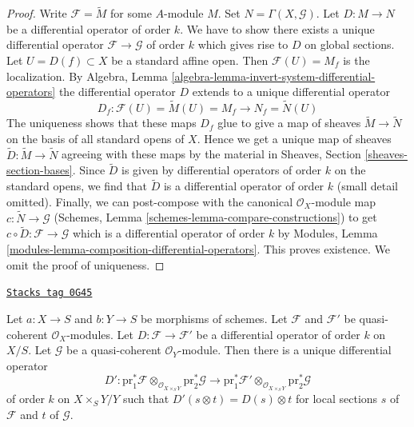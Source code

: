 \begin{proof}
Write $\mathcal{F} = \widetilde{M}$ for some $A$-module $M$. Set
$N = \Gamma(X, \mathcal{G})$. Let $D : M \to N$ be a differential
operator of order $k$. We have to show there exists
a unique differential operator $\mathcal{F} \to \mathcal{G}$ of order $k$
which gives rise to $D$ on global sections. Let $U = D(f) \subset X$
be a standard affine open. Then $\mathcal{F}(U) = M_f$ is the localization.
By Algebra, Lemma \ref{algebra-lemma-invert-system-differential-operators}
the differential operator $D$ extends to a unique differential operator
$$
D_f : \mathcal{F}(U) = \widetilde{M}(U) = M_f \to N_f = \widetilde{N}(U)
$$
The uniqueness shows that these maps $D_f$ glue to give a map of sheaves
$\widetilde{M} \to \widetilde{N}$ on the basis of all standard opens
of $X$. Hence we get a unique map of sheaves
$\widetilde{D} : \widetilde{M} \to \widetilde{N}$ agreeing with these maps
by the material in Sheaves, Section \ref{sheaves-section-bases}.
Since $\widetilde{D}$ is given by differential operators of order $k$ on
the standard opens, we find that $\widetilde{D}$ is a differential operator
of order $k$ (small detail omitted).
Finally, we can post-compose with the canonical $\mathcal{O}_X$-module map
$c : \widetilde{N} \to \mathcal{G}$
(Schemes, Lemma \ref{schemes-lemma-compare-constructions})
to get $c \circ \widetilde{D} : \mathcal{F} \to \mathcal{G}$
which is a differential operator of order $k$ by
Modules, Lemma \ref{modules-lemma-composition-differential-operators}.
This proves existence. We omit the proof of uniqueness.
\end{proof}

\begin{lemma}
\label{morphisms-lemma-base-change-differential-operators}
\href{https://stacks.math.columbia.edu/tag/0G45}{\texttt{Stacks tag 0G45}}

Let $a : X \to S$ and $b : Y \to S$ be morphisms of schemes.
Let $\mathcal{F}$ and $\mathcal{F}'$ be quasi-coherent $\mathcal{O}_X$-modules.
Let $D : \mathcal{F} \to \mathcal{F}'$ be a differential operator
of order $k$ on $X/S$. Let $\mathcal{G}$ be a quasi-coherent
$\mathcal{O}_Y$-module. Then there is a unique differential
operator
$$
D' :
\text{pr}_1^*\mathcal{F} \otimes_{\mathcal{O}_{X \times_S Y}}
\text{pr}_2^*\mathcal{G}
\longrightarrow
\text{pr}_1^*\mathcal{F}' \otimes_{\mathcal{O}_{X \times_S Y}}
\text{pr}_2^*\mathcal{G}
$$
of order $k$ on $X \times_S Y / Y$ such that
$
D'(s \otimes t) = D(s) \otimes t
$
for local sections $s$ of $\mathcal{F}$ and $t$ of $\mathcal{G}$.
\end{lemma}

